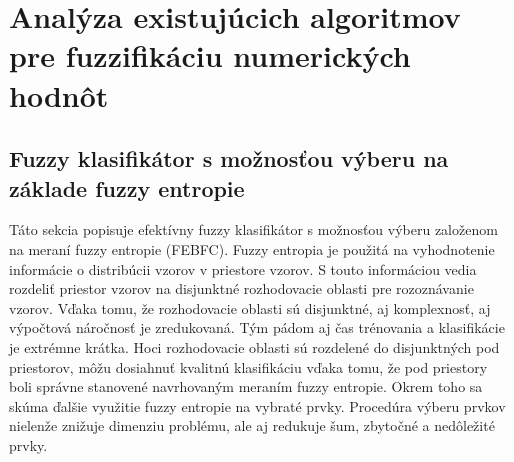 
\chapter{Analýza existujúcich algoritmov pre fuzzifikáciu numerických hodnôt} 

\section{Fuzzy klasifikátor s možnosťou výberu na základe fuzzy entropie} 
Táto sekcia popisuje efektívny fuzzy klasifikátor s možnosťou výberu založenom na meraní fuzzy entropie (FEBFC).
Fuzzy entropia je použitá na vyhodnotenie informácie o distribúcii vzorov v priestore vzorov. S touto informáciou vedia rozdeliť priestor vzorov na disjunktné rozhodovacie oblasti pre rozoznávanie vzorov. Vďaka tomu, že rozhodovacie oblasti sú disjunktné, aj komplexnosť, aj výpočtová náročnosť je zredukovaná. Tým pádom aj čas trénovania a klasifikácie je extrémne krátka. Hoci rozhodovacie oblasti sú rozdelené do disjunktných pod priestorov, môžu dosiahnuť kvalitnú klasifikáciu vďaka tomu, že pod priestory boli správne stanovené navrhovaným meraním fuzzy entropie. Okrem toho sa skúma ďalšie využitie fuzzy entropie na vybraté prvky. Procedúra výberu prvkov nielenže znižuje dimenziu problému, ale aj redukuje šum, zbytočné a nedôležité prvky.

